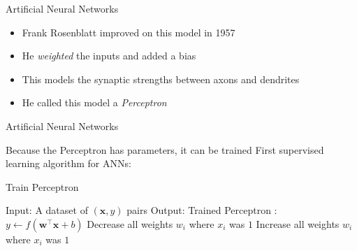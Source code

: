 \begin{slide}{Artificial Neural Networks}
  \begin{itemize}
    \item<1-> Frank Rosenblatt improved on this model in 1957
    \item<2-> He \emph{weighted} the inputs and added a bias
    \item<3-> This models the synaptic strengths between axons and dendrites
    \item<4-> He called this model a \emph{Perceptron}
  \end{itemize}
  \vspace{0.5cm}

\end{slide}

\renewcommand{\thealgorithm}{}
\begin{slide}{Artificial Neural Networks}
  \begin{itemize}
    \pitem Because the Perceptron has parameters, it can be trained
    \pitem First supervised learning algorithm for ANNs:
  \end{itemize}
  \pause
  \begin{algorithm}[H]
  \caption{Train Perceptron}
  \begin{algorithmic}
  \State Input: A dataset of $(\mathbf{x}, \hat{y})$ pairs
  \State Output: Trained Perceptron
  :
    \State $y \gets f(\mathbf{w}^\top \mathbf{x} + b)$
        \State Decrease all weights $w_i$ where $x_i$ was $1$
        \State Increase all weights $w_i$ where $x_i$ was $1$
      \EndIf
    \EndIf
  \EndFor
  \end{algorithmic}
  \end{algorithm}
\end{slide}

